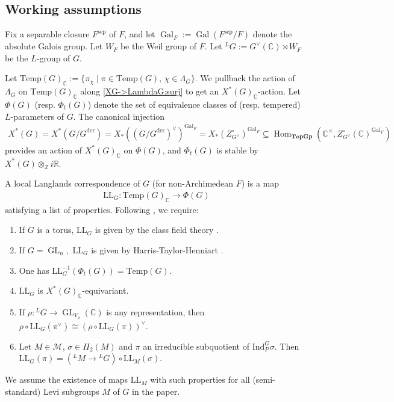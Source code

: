 \documentclass[10pt]{amsart}
\theoremstyle{definition}
\numberwithin{equation}{section}
\DeclareMathOperator{\Hom}{\mathrm{Hom}}
\DeclareMathOperator{\GL}{\mathrm{GL}}
\DeclareMathOperator{\Gal}{\mathrm{Gal}}
\numberwithin{equation}{subsection}
\newcommand{\Ind}{\mathrm{Ind}}
\newcommand{\CC}{\mathbb{C}}
\newcommand{\Temp}{\mathrm{Temp}}
\begin{document}
\subsection{Working assumptions} \label{ssec:assumptions}
Fix a separable closure $F^{\mathrm{sep}}$ of $F$, and let $\Gal_F:=\Gal(F^{\mathrm{sep}}/F)$ denote the absolute Galois group. Let $W_F$ be the Weil group of $F$. Let ${}^LG:=G^\vee(\mathbb{C})\rtimes W_F$ be the $L$-group of $G$. 

Let $\mathrm{Temp}(G)_\CC:=\{\pi_\chi\mid \pi\in\Temp(G),\,\chi\in\Lambda_G\}.$ We pullback the action of $\Lambda_G$ on $\mathrm{Temp}(G)_\CC$ along \eqref{XG->LambdaG:surj} to get an $X^*(G)_\mathbb{C}$-action.  Let $\Phi(G)$ (resp. $\Phi_t(G)$) denote the set of equivalence classes of (resp. tempered) $L$-parameters of $G$. The canonical injection 
\begin{align}\label{X*G:pair:ZGvee}
    X^*(G) = X^*(G/G^{\mathrm{der}}) = X_*((G/G^{\mathrm{der}})^\vee)^{\Gal_F} = X_*(Z_{G^\vee}^\circ)^{\Gal_F} \subseteq \Hom_{\textbf{TopGp}}(\CC^\times,Z_{G^\vee}^\circ(\CC)^{\Gal_F})
\end{align}
provides an action of $X^*(G)_\mathbb{C}$ on $\Phi(G)$, and $\Phi_t(G)$ is stable by $X^*(G)\otimes_\mathbb{Z}i\mathbb{R}$. 



A local Langlands correspondence of $G$ (for non-Archimedean $F$) is a map 
\begin{align*}
    \mathrm{LL}_G:\mathrm{Temp}(G)_\CC\to \Phi(G)
\end{align*}
satisfying a list of properties. Following \cite{DRS}, we require:
\begin{enumerate}[label=(LLC\text{\arabic*}), ref=LLC\text{\arabic*}]
    \item\label{LLC:LCFT} If $G$ is a torus, $\mathrm{LL}_G$ is given by the class field theory \cite{Langlands:tori}.
    \item\label{LLC:GL} If $G=\GL_n,$ $\mathrm{LL}_G$ is given by Harris-Taylor-Henniart \cite{Harris-Taylor,Henniart}.
    \item\label{LLC:temp} One has $\mathrm{LL}_G^{-1}(\Phi_t(G)) = \Temp(G)$.
    \item\label{LLC:twist} $\mathrm{LL}_G$ is $X^*(G)_\mathbb{C}$-equivariant.
    \item\label{LLC:dual} If $\rho:{}^LG\to\GL_{V_\rho}(\mathbb{C})$ is any representation, then $\rho\circ \mathrm{LL}_G(\pi^\vee)\cong (\rho\circ\mathrm{LL}_G(\pi))^\vee$. 
    \item\label{LLC:para} Let $M\in\mathcal{M}$, $\sigma\in\Pi_2(M)$ and $\pi$ an irreducible subquotient of $\Ind_P^G\sigma$. Then $\mathrm{LL}_G(\pi) = ({}^LM\to {}^LG)\circ \mathrm{LL}_M(\sigma)$.
\end{enumerate}
We assume the existence of maps $\mathrm{LL}_M$ with such properties for all (semi-standard) Levi subgroups $M$ of $G$ in the paper. 
\end{document}
